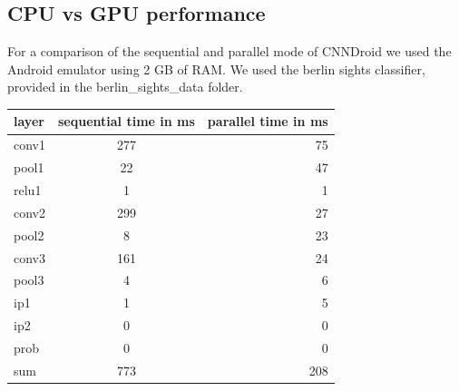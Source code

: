 \subsection{CPU vs GPU performance}
For a comparison of the sequential and parallel mode of CNNDroid we used the Android emulator using 2 GB of RAM. We used the berlin sights classifier, provided in the berlin\_sights\_data folder.

\begin{center}
  \begin{tabular}{l|c|r}
    layer & sequential time in ms & parallel time in ms \\\hline
    conv1 & 277 & 75\\
    pool1 & 22 & 47\\
    relu1 & 1 & 1\\
    conv2 & 299 & 27\\
    pool2 & 8 & 23\\
    conv3 & 161 & 24\\
    pool3 & 4 & 6\\
    ip1 & 1 & 5\\
    ip2 & 0 & 0\\
    prob & 0 & 0\\\hline
    sum & 773 & 208\\
  \end{tabular}
\end{center}


